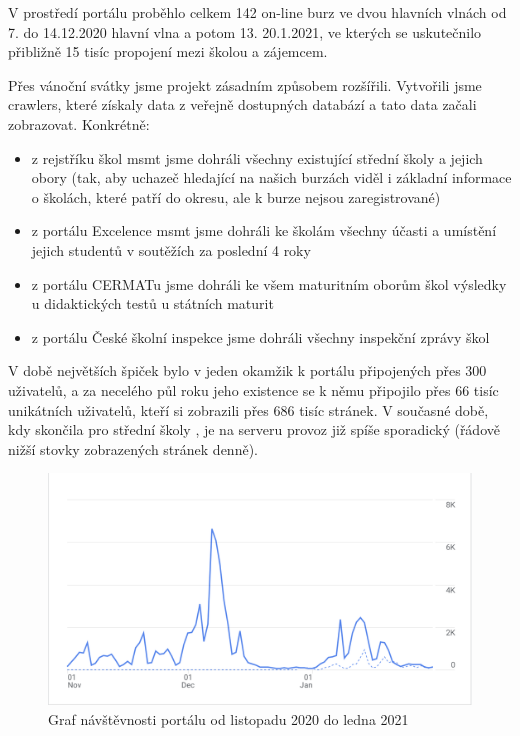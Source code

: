 V prostředí portálu proběhlo celkem 142 on-line burz ve dvou hlavních vlnách od 7. do 14.12.2020 \textemdash{} hlavní vlna a potom 13. \textemdash{} 20.1.2021,
ve kterých se uskutečnilo přibližně 15 tisíc propojení mezi školou a zájemcem. 

Přes vánoční svátky jsme projekt zásadním způsobem rozšířili.
Vytvořili jsme \glspl{crawler}, které získaly data z veřejně dostupných databází a tato data začali zobrazovat. Konkrétně: 

\begin{itemize}
  \item z rejstříku škol \acrshort{msmt} jsme dohráli všechny existující střední školy a jejich obory (tak, aby uchazeč hledající na našich burzách viděl i základní informace o školách, které patří do okresu, ale k burze nejsou zaregistrované)
  \item z portálu Excelence \acrshort{msmt} jsme dohráli ke školám všechny účasti a umístění jejich studentů v soutěžích za poslední 4 roky
  \item z portálu CERMATu jsme dohráli ke všem maturitním oborům škol výsledky u didaktických testů u státních maturit
  \item z portálu České školní inspekce jsme dohráli všechny inspekční zprávy škol
\end{itemize}

V době největších špiček bylo v jeden okamžik k portálu připojených přes 300 uživatelů, 
a za necelého půl roku jeho existence se k němu připojilo přes 66 tisíc unikátních uživatelů,
kteří si zobrazili přes 686 tisíc stránek.
V současné době, kdy skončila pro střední školy , je na serveru provoz již spíše sporadický (řádově nižší stovky zobrazených stránek denně). 


\begin{figure}[H]
\centering
\includegraphics[width=\textwidth]{img/listopad-leden-navstevnost.png}
\caption{Graf návštěvnosti portálu \bso{} od listopadu 2020 do ledna 2021}\label{fig:navstevnost}
\end{figure}

